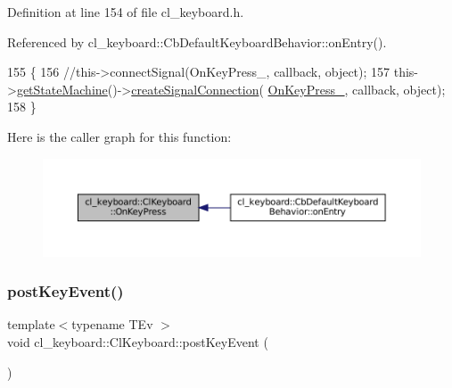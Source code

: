 Definition at line 154 of file cl\+\_\+keyboard.\+h.



Referenced by cl\+\_\+keyboard\+::\+Cb\+Default\+Keyboard\+Behavior\+::on\+Entry().


\begin{DoxyCode}
155         \{
156                 \textcolor{comment}{//this->connectSignal(OnKeyPress\_, callback, object);}
157                 this->\hyperlink{classsmacc_1_1ISmaccClient_aec51d4712404cb9882b86e4c854bb93a}{getStateMachine}()->\hyperlink{classsmacc_1_1ISmaccStateMachine_adf0f42ade0c65cc471960fe2a7c42da2}{createSignalConnection}(
      \hyperlink{classcl__keyboard_1_1ClKeyboard_ae7fb61a86ed9cdd313f0cc1b2661c63c}{OnKeyPress\_}, callback, \textcolor{keywordtype}{object});
158         \}
\end{DoxyCode}
Here is the caller graph for this function\+:
\nopagebreak
\begin{figure}[H]
\begin{center}
\leavevmode
\includegraphics[width=350pt]{classcl__keyboard_1_1ClKeyboard_ae9f4a6dc1ce18397394a432826970baa_icgraph}
\end{center}
\end{figure}
\mbox{\label{classcl__keyboard_1_1ClKeyboard_ac1311ce9a6a64e590df2e1b088f0e733}} 
\subsubsection{\texorpdfstring{post\+Key\+Event()}{postKeyEvent()}}
{\footnotesize\ttfamily template$<$typename T\+Ev $>$ \\
void cl\+\_\+keyboard\+::\+Cl\+Keyboard\+::post\+Key\+Event (\begin{DoxyParamCaption}{ }\end{DoxyParamCaption})\hspace{0.3cm}{\ttfamily [inline]}}




